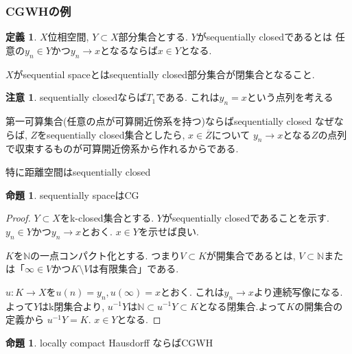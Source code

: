 \documentclass[dvipdfmx,a4paper,11pt]{article}
\newcommand{\N}{\mathbb{N}}
\theoremstyle{definition}
\newtheorem{prop}[thm]{命題}
\newtheorem{dfn}[thm]{定義}
\newtheorem{rem}[thm]{注意}
\begin{document}
\subsubsection{CGWHの例}

 \begin{tcolorbox}
 [colback = white, colframe = green!35!black, fonttitle = \bfseries,breakable = true]
\begin{dfn}\cite{Str}
$X$位相空間, $Y \subset X$部分集合とする.
$Y$がsequentially closedであるとは
任意の$y_n \in Y$かつ$y_n \to x$となるならば$x \in Y$となる.

$X$がsequential spaceとはsequentially closed部分集合が閉集合となること. 
\end{dfn}
\end{tcolorbox}
\begin{rem}
sequentially closedならば$T_1$である. これは$y_n =x$という点列を考える

第一可算集合(任意の点が可算開近傍系を持つ)ならばsequentially closed
なぜならば, $Z$をsequentially closed集合としたら, $x \in \overline{Z}$について
$y_n \to x$となる$Z$の点列で収束するものが可算開近傍系から作れるからである.

特に距離空間はsequentially closed
\end{rem}

 \begin{tcolorbox}
 [colback = white, colframe = green!35!black, fonttitle = \bfseries,breakable = true]
\begin{prop}\cite[Prop 1.6]{Str}
sequentially spaceはCG
\end{prop}
\end{tcolorbox}
\begin{proof}
$Y \subset X$をk-closed集合とする.
$Y$がsequentially closedであることを示す.
$y_n \in Y$かつ$y_n \to x$とおく. $x \in Y$を示せば良い.

$K$を$\N$の一点コンパクト化とする.
つまり$V \subset K$が開集合であるとは, $V \subset \N$または「$\infty \in V$かつ$K \setminus V$は有限集合」である. 

$u : K \to X$を$u(n)=y_n, u(\infty)=x$とおく. 
これは$y_n \to x$より連続写像になる. 
よって$Y$はk閉集合より, $u^{-1}Y$は$\N \subset u^{-1}Y\subset K$となる閉集合.よって$K$の開集合の定義から $u^{-1}Y = K$. $x \in Y$となる. 
\end{proof}

 \begin{tcolorbox}
 [colback = white, colframe = green!35!black, fonttitle = \bfseries,breakable = true]
\begin{prop}\cite[Prop 1.7]{Str}
locally compact Hausdorff ならばCGWH
\end{prop}
\end{tcolorbox}
\end{document}
